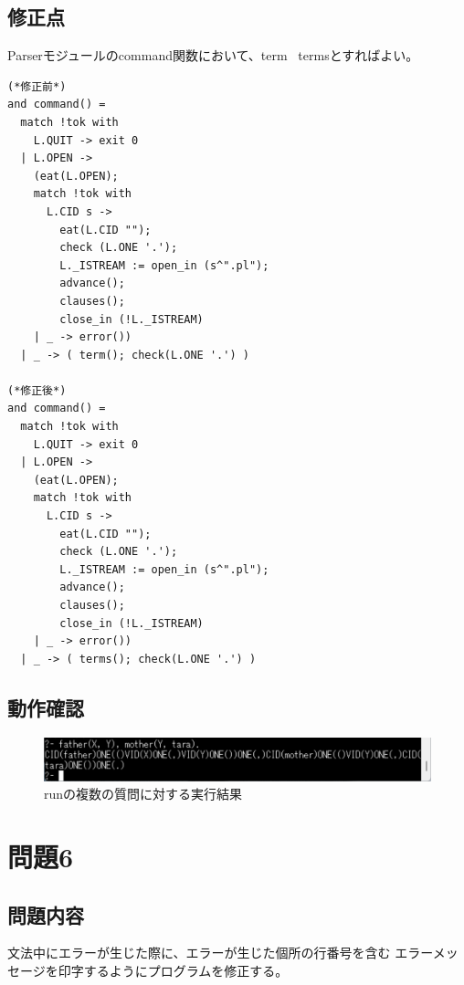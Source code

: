 \documentclass{ltjsarticle}
\begin{document}
\subsection{修正点}
Parserモジュールのcommand関数において、term \rightarrow \ termsとすればよい。


\begin{lstlisting}[caption = commandの修正]
(*修正前*)
and command() = 
  match !tok with
    L.QUIT -> exit 0
  | L.OPEN -> 
    (eat(L.OPEN);
    match !tok with
      L.CID s -> 
        eat(L.CID ""); 
        check (L.ONE '.');
        L._ISTREAM := open_in (s^".pl");
        advance(); 
        clauses(); 
        close_in (!L._ISTREAM)
    | _ -> error())
  | _ -> ( term(); check(L.ONE '.') )

(*修正後*)
and command() = 
  match !tok with
    L.QUIT -> exit 0
  | L.OPEN -> 
    (eat(L.OPEN);
    match !tok with
      L.CID s -> 
        eat(L.CID ""); 
        check (L.ONE '.');
        L._ISTREAM := open_in (s^".pl");
        advance(); 
        clauses(); 
        close_in (!L._ISTREAM)
    | _ -> error())
  | _ -> ( terms(); check(L.ONE '.') )
\end{lstlisting}


\subsection{動作確認}
\begin{figure}[ht]
  \centering
  \caption{runの複数の質問に対する実行結果}
  \label{fig:run_kamma}
  \includegraphics[scale = 0.6]{run_komma.png}
\end{figure}

\section{問題6}
\subsection{問題内容}
文法中にエラーが生じた際に、エラーが生じた個所の行番号を含む
エラーメッセージを印字するようにプログラムを修正する。
\end{document}
